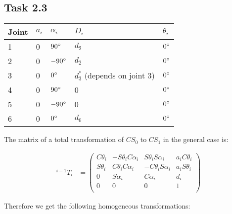 \subsection*{Task 2.3}

\begin{center}
	\begin{tabular}{ | l | l | l | l | l |}
		\hline
		Joint & $a_{i}$ & $\alpha_{i}$ & $D_i$ & $\theta_i$ \\ \hline
		1 & 0 & $90\degree$ & $d_2$ & $0\degree$\\ \hline
		2 & 0 & $-90\degree$ & $d_2$ & $0\degree$\\ \hline
		3 & 0 & $0\degree$ & $d^*_3$ (depends on joint 3) & $0\degree$\\ \hline
		4 & 0 & $90\degree$ & 0 & $0\degree$\\ \hline
		5 & 0 & $-90\degree$ & 0 & $0\degree$\\ \hline
		6 & 0 & $0\degree$ & $d_6$ & $0\degree$\\ \hline
	\end{tabular}
\end{center}

The matrix of a total transformation of $CS_0$ to $CS_1$ in the general case is:

\begin{align*}
^{i-1}T_i &= 
\begin{pmatrix}
C\theta_i & -S\theta_iC\alpha_i & S\theta_iS\alpha_i & a_iC\theta_i \\
S\theta_i & C\theta_iC\alpha_i & -C\theta_iS\alpha_i & a_iS\theta_i \\
0 & S\alpha_i & C\alpha_i & d_i \\
0 & 0 & 0 & 1 \\
\end{pmatrix}
\end{align*}

Therefore we get the following homogeneous transformations:
